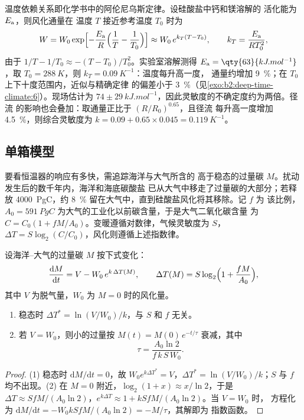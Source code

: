 温度依赖关系即化学书中的阿伦尼乌斯定律。设硅酸盐中钙和镁溶解的
活化能为 $E_{\text a}$，则风化通量在
温度 $T$ 接近参考温度 $T_0$ 时为
\[
  W = W_0 \exp\Bigl[-\frac{E_{\text a}}{R}\Bigl(\frac1T - \frac1{T_0}\Bigr)\Bigr]
  \approx W_0\, e^{k_T (T - T_0)}, \qquad k_T = \frac{E_{\text a}}{R T_0^2},
\]
由于 $1/T - 1/T_0 \approx -(T - T_0)/T_0^2$。实验室溶解测得 $E_{\text a} =
\qty{63}{kJ.mol^{-1}}$，取 $T_0 = \qty{288}{K}$，则 $k_T = \qty{0.09}{K^{-1}}$：温度每升高一度，
通量约增加 \qty{9}{\percent}；在 $T_0$ 上下十度范围内，近似与精确定律
的偏差小于 \qty{3}{\percent}（见\cref{exo:b2:deep-time-climate:6}）。现场估计为
$74 \pm \qty{29}{kJ.mol^{-1}}$，因此灵敏度的不确定度约为两倍。径流
的影响也会叠加：取通量正比于 $(R/R_0)^{0.65}$，且径流
每升高一度增加 \qty{4.5}{\percent}，则综合灵敏度为 $k = 0.09 + 0.65\times0.045 =
\qty{0.119}{K^{-1}}$。

\subsection*{单箱模型}

要看恒温器的响应有多快，需追踪海洋与大气所含的
高于稳态的过量碳 $M$。扰动发生后的数千年内，海洋和海底碳酸盐
已从大气中移走了过量碳的大部分；若释放 \qty{4000}{PgC}，约
\qty{8}{\percent} 留在大气中，直到硅酸盐风化将其移除。记 $f$ 为
该比例，$A_0 = \qty{591}{PgC}$ 为大气的工业化以前碳含量，于是大气二氧化碳含量
为 $C = C_0(1 + fM/A_0)$。变暖遵循对数律，气候灵敏度为
$S$，$\Delta T = S\log_2(C/C_0)$，风化则遵循上述指数律。

\begin{proposition}[恒温器的稳态与时间常数]\label{prop:b2:deep-time-climate:thermostat}
设海洋–大气的过量碳 $M$ 按下式变化：
\[
  \frac{\mathrm dM}{\mathrm dt} = V - W_0\,e^{k\,\Delta T(M)}, \qquad
  \Delta T(M) = S\log_2\Bigl(1 + \frac{fM}{A_0}\Bigr),
\]
其中 $V$ 为脱气量，$W_0$ 为 $M = 0$ 时的风化量。
\begin{enumerate}
  \item 稳态时 $\Delta T^* = \ln(V/W_0)/k$，与 $S$ 和 $f$ 无关。
  \item 若 $V = W_0$，则小的过量按 $M(t) = M(0)\,e^{-t/\tau}$ 衰减，其中
        \[
          \tau = \frac{A_0 \ln 2}{f\,k\,S\,W_0} .
        \]
\end{enumerate}
\end{proposition}

\begin{proof}
(1) 稳态时 $\mathrm dM/\mathrm dt = 0$，故 $W_0e^{k\Delta T^*} = V$，$\Delta T^* =
\ln(V/W_0)/k$；$S$ 与 $f$ 均不出现。(2) 在 $M = 0$ 附近，$\log_2(1 + x) \approx x/\ln 2$，于是
$\Delta T \approx SfM/(A_0\ln 2)$，$e^{k\Delta T} \approx 1 + kSfM/(A_0\ln2)$。当 $V = W_0$ 时，
方程化为 $\mathrm dM/\mathrm dt = -W_0kSfM/(A_0\ln 2) = -M/\tau$，其解即为
指数函数。
\end{proof}


